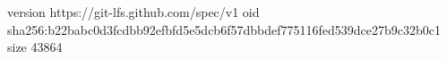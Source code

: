version https://git-lfs.github.com/spec/v1
oid sha256:b22babc0d3fcdbb92efbfd5e5dcb6f57dbbdef775116fed539dce27b9c32b0c1
size 43864
